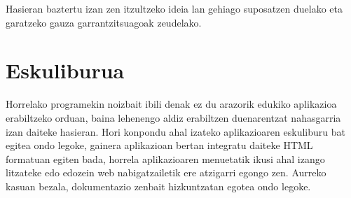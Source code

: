 Hasieran baztertu izan zen itzultzeko ideia lan gehiago suposatzen duelako eta garatzeko gauza garrantzitsuagoak zeudelako.

\section{Eskuliburua}
Horrelako programekin noizbait ibili denak ez du arazorik edukiko aplikazioa erabiltzeko orduan, baina lehenengo aldiz erabiltzen duenarentzat nahasgarria izan daiteke hasieran. Hori konpondu ahal izateko aplikazioaren eskuliburu bat egitea ondo legoke, gainera aplikazioan bertan integratu daiteke HTML formatuan egiten bada, horrela aplikazioaren menuetatik ikusi ahal izango litzateke edo edozein web nabigatzailetik ere atzigarri egongo zen. Aurreko kasuan bezala, dokumentazio zenbait hizkuntzatan egotea ondo legoke.
